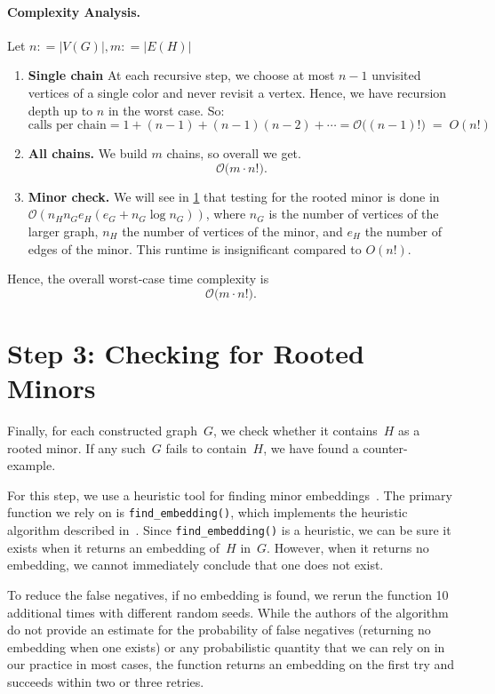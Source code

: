\paragraph{Complexity Analysis.}

Let $n: = |V(G)|, m: = |E(H)|$

\begin{enumerate}
  \item \textbf{Single chain}
 At each recursive step, we choose at most \(n\!-\!1\) unvisited vertices of a single color and never revisit a vertex. Hence, we have recursion depth up to \(n\) in the worst case. So:
    \[
 \text{calls per chain}
 = 1 + (n-1) + (n-1)(n-2) + \cdots 
 = \mathcal{O}\bigl((n-1)!\bigr)
      \;=\; O(n!) 
    \]
  \item \textbf{All chains.}
 We build \(m\) chains, so overall we get.
    \[
      \mathcal{O}\bigl(m \cdot n!\bigr).
    \]
  \item \textbf{Minor check.}
 We will see in \ref{sec:check-minor} that testing for the rooted minor is done in \(\mathcal{O}(n_Hn_Ge_H(e_G + n_G\log{n_G}))\), where $n_G$ is the number of vertices of the larger graph, $n_H$ the number of vertices of the minor, and $e_H$ the number of edges of the minor. This runtime is 
 insignificant compared to $O(n!)$.
\end{enumerate}

Hence, the overall worst‑case time complexity is
\[
    \mathcal{O}\bigl(m \cdot n!\bigr).
\]


\section{Step 3: Checking for Rooted Minors}\label{sec:check-minor}
Finally, for each constructed graph~$G$, we check whether it contains~$H$ as a rooted minor. If any such~$G$ fails to contain~$H$, we have found a counter-example.

For this step, we use a heuristic tool for finding minor embeddings~\cite{dwavesystems2023minorminer}. The primary function we rely on is \texttt{find\_embedding()}, which implements the heuristic algorithm described in~\cite{cai2014practicalheuristicfindinggraph}.
Since \texttt{find\_embedding()} is a heuristic, we can be sure it exists when it returns an embedding of~$H$ in~$G$. However, when it returns no embedding, we cannot immediately conclude that one does not exist.

To reduce the false negatives, if no embedding is found, we rerun the function 10 additional times with different random seeds. While the authors of the algorithm do not provide an estimate for the probability of false negatives (returning no embedding when one exists) or any 
probabilistic quantity that we can rely on in our practice in most cases,
the function returns an embedding on the first try and succeeds within two or three retries.

